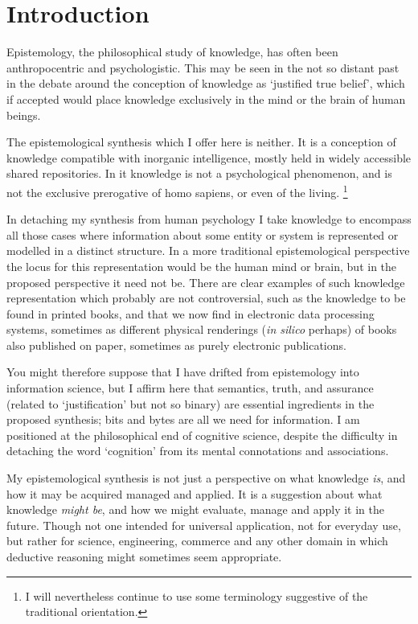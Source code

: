 \documentclass[10pt,titlepage]{book}
\begin{document}
\chapter{Introduction}

Epistemology, the philosophical study of knowledge, has often been anthropocentric and psychologistic.
This may be seen in the not so distant past in the debate around the conception of knowledge as `justified true belief', which if accepted would place knowledge exclusively in the mind or the brain of human beings.

The epistemological synthesis which I offer here is neither.
It is a conception of knowledge compatible with inorganic intelligence, mostly held in widely accessible shared repositories.
In it knowledge is not a psychological phenomenon, and is not the exclusive prerogative of homo sapiens, or even of the living.%
\footnote{I will nevertheless continue to use some terminology suggestive of the traditional orientation.}

In detaching my synthesis from human psychology I take knowledge to encompass all those cases where information about some entity or system is represented or modelled in a distinct structure.
In a more traditional epistemological perspective the locus for this representation would be the human mind or brain, but in the proposed perspective it need not be.
There are clear examples of such knowledge representation which probably are not controversial, such as the knowledge to be found in printed books, and that we now find in electronic data processing systems, sometimes as different physical renderings (\emph{in silico} perhaps) of books also published on paper, sometimes as purely electronic publications.

You might therefore suppose that I have drifted from epistemology into information science, but I affirm here that semantics, truth, and assurance (related to `justification' but not so binary) are essential ingredients in the proposed synthesis; bits and bytes are all we need for information.
I am positioned at the philosophical end of cognitive science, despite the difficulty in detaching the word `cognition' from its mental connotations and associations.

My epistemological synthesis is not just a perspective on what knowledge \emph{is}, and how it may be acquired managed and applied.
It is a suggestion about what knowledge \emph{might be}, and how we might evaluate, manage and apply it in the future.
Though not one intended for universal application, not for everyday use, but rather for science, engineering, commerce and any other domain in which deductive reasoning might sometimes seem appropriate.
\end{document}

